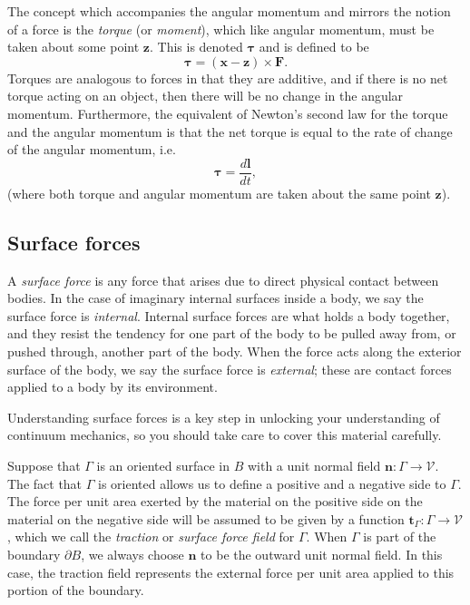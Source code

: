 \documentclass[
  letterpaper,
  DIV=11,
  numbers=noendperiod]{scrreprt}
\theoremstyle{plain}
\theoremstyle{remark}
\begin{document}
The concept which accompanies the angular momentum and mirrors the
notion of a force is the \emph{torque} (or \emph{moment}), which like
angular momentum, must be taken about some point \({\boldsymbol{z}}\).
This is denoted \({\boldsymbol{\tau}}\) and is defined to be
\[{\boldsymbol{\tau}}= ({\boldsymbol{x}}-{\boldsymbol{z}})\times{\boldsymbol{F}}.\]
Torques are analogous to forces in that they are additive, and if there
is no net torque acting on an object, then there will be no change in
the angular momentum. Furthermore, the equivalent of Newton's second law
for the torque and the angular momentum is that the net torque is equal
to the rate of change of the angular momentum, i.e. \[
{\boldsymbol{\tau}}= \frac{d{\boldsymbol{l}}}{dt},
\] (where both torque and angular momentum are taken about the same
point \({\boldsymbol{z}}\)).

\subsection{Surface forces}\label{surface-forces}

A \emph{surface force} is any force that arises due to direct physical
contact between bodies. In the case of imaginary internal surfaces
inside a body, we say the surface force is \emph{internal}. Internal
surface forces are what holds a body together, and they resist the
tendency for one part of the body to be pulled away from, or pushed
through, another part of the body. When the force acts along the
exterior surface of the body, we say the surface force is
\emph{external}; these are contact forces applied to a body by its
environment.

Understanding surface forces is a key step in unlocking your
understanding of continuum mechanics, so you should take care to cover
this material carefully.

Suppose that \(\Gamma\) is an oriented surface in \(B\) with a unit
normal field \({\boldsymbol{n}}:\Gamma\to{\mathcal{V}}\). The fact that
\(\Gamma\) is oriented allows us to define a positive and a negative
side to \(\Gamma\). The force per unit area exerted by the material on
the positive side on the material on the negative side will be assumed
to be given by a function
\({\boldsymbol{t}}_\Gamma:\Gamma\to{\mathcal{V}}\), which we call the
\emph{traction} or \emph{surface force field} for \(\Gamma\). When
\(\Gamma\) is part of the boundary \(\partial B\), we always choose
\({\boldsymbol{n}}\) to be the outward unit normal field. In this case,
the traction field represents the external force per unit area applied
to this portion of the boundary.
\end{document}
